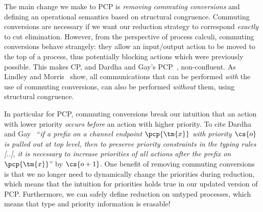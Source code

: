 The main change we make to PCP is \emph{removing commuting conversions} and defining an operational semantics based on structural congruence. Commuting conversions are necessary if we want our reduction strategy to correspond \emph{exactly} to cut elimination.
However, from the perspective of process calculi, commuting conversions behave strangely: they allow an input/output action to be moved to the top of a process, thus potentially blocking actions which were previously possible. This makes CP, and Dardha and Gay's PCP~\cite{dardhagay18extended}, non-confluent.
As Lindley and Morris~\cite{lindleymorris15} show, all communications that can be performed \emph{with} the use of commuting conversions, can also be performed \emph{without} them, using structural congruence.


In  particular for PCP, commuting conversions break our intuition that an action with lower priority \emph{occurs before} an action with higher priority. To cite Dardha and Gay~\cite{dardhagay18extended} ``\emph{if a prefix on a channel endpoint $\pcp{\tm{x}}$ with priority $\cs{o}$ is pulled out at top level, then to preserve priority constraints in the typing rules [..], it is necessary to increase priorities of all actions after the prefix on $\pcp{\tm{x}}$}'' by $\cs{o+1}$.
One benefit of removing commuting conversions is that we no longer need to dynamically change the priorities during reduction, which means that the intuition for priorities holds true in our updated version of PCP. Furthermore, we can safely define reduction on untyped processes, which means that type and priority information is erasable!

